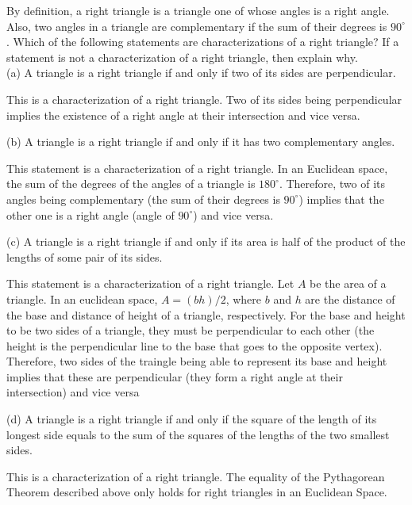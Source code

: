 \documentclass[12pt]{article}
\newenvironment{problem}[2][Problem]{\begin{trivlist}
		\item[\hskip \labelsep {\bfseries #1}\hskip \labelsep {\bfseries #2.}]}{\end{trivlist}}
\newenvironment{solution}[2][Solution]{\begin{trivlist}
		\item[\hskip \labelsep {\bfseries #1}\hskip \labelsep {\bfseries #2.}]}{\end{trivlist}}
\begin{document}
	\begin{problem}{83}
		By definition, a right triangle is a triangle one of whose angles is a right angle. Also, two angles in a triangle are complementary if the sum of their degrees is $90^{\circ}$. Which of the following statements are characterizations of a right triangle? If a statement is not a characterization of a right triangle, then explain why.\\
		
		(a) A triangle is a right triangle if and only if two of its sides are perpendicular.
		\begin{solution}{a}
			This is a characterization of a right triangle. Two of its sides being perpendicular implies the existence of a right angle at their intersection and vice versa.
		\end{solution}
	
		(b) A triangle is a right triangle if and only if it has two complementary angles.
		\begin{solution}{b}
			This statement is a characterization of a right triangle. In an Euclidean space, the sum of the degrees of the angles of a triangle is $180^{\circ}$. Therefore, two of its angles being complementary (the sum of their degrees is $90^{\circ}$) implies that the other one is a right angle (angle of $90^{\circ}$) and vice versa.
		\end{solution}
	
		(c) A triangle is a right triangle if and only if its area is half of the product of the lengths of some pair of its sides.
		\begin{solution}{c}
			This statement is a characterization of a right triangle. Let $A$ be the area of a triangle. In an euclidean space, $A = (bh)/2$, where $b$ and $h$ are the distance of the base and distance of height of a triangle, respectively. For the base and height to be two sides of a triangle, they must be perpendicular to each other (the height is the perpendicular line to the base that goes to the opposite vertex). Therefore, two sides of the traingle being able to represent its base and height implies that these are perpendicular (they form a right angle at their intersection) and vice versa
		\end{solution}
		
		(d) A triangle is a right triangle if and only if the square of the length of its longest side equals to the sum of the squares of the lengths of the two smallest sides.
		\begin{solution}{d} 
			This is a characterization of a right triangle. The equality of the Pythagorean Theorem described above only holds for right triangles in an Euclidean Space.
		\end{solution} 
	

\end{problem}
\end{document}
